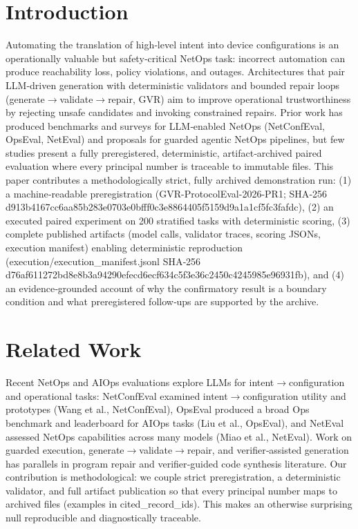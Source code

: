 \documentclass[conference]{IEEEtran}
\begin{document}
\section{Introduction}
Automating the translation of high‑level intent into device configurations is an operationally valuable but safety‑critical NetOps task: incorrect automation can produce reachability loss, policy violations, and outages. Architectures that pair LLM‑driven generation with deterministic validators and bounded repair loops (generate\ensuremath{\rightarrow}validate\ensuremath{\rightarrow}repair, GVR) aim to improve operational trustworthiness by rejecting unsafe candidates and invoking constrained repairs. Prior work has produced benchmarks and surveys for LLM‑enabled NetOps (NetConfEval, OpsEval, NetEval) and proposals for guarded agentic NetOps pipelines, but few studies present a fully preregistered, deterministic, artifact‑archived paired evaluation where every principal number is traceable to immutable files. This paper contributes a methodologically strict, fully archived demonstration run: (1) a machine‑readable preregistration (GVR-ProtocolEval-2026-PR1; SHA‑256 d913b4167cc6aa85b283e0703e0bfff0c3e8864405f5159d9a1a1cf5fc3fafdc), (2) an executed paired experiment on 200 stratified tasks with deterministic scoring, (3) complete published artifacts (model calls, validator traces, scoring JSONs, execution manifest) enabling deterministic reproduction (execution/execution\_manifest.jsonl SHA‑256 d76af611272bd8e8b3a94290efecd6ecf634c5f3e36c2450c4245985e96931fb), and (4) an evidence‑grounded account of why the confirmatory result is a boundary condition and what preregistered follow‑ups are supported by the archive.

\section{Related Work}
Recent NetOps and AIOps evaluations explore LLMs for intent\ensuremath{\rightarrow}configuration and operational tasks: NetConfEval examined intent\ensuremath{\rightarrow}configuration utility and prototypes (Wang et al., NetConfEval), OpsEval produced a broad Ops benchmark and leaderboard for AIOps tasks (Liu et al., OpsEval), and NetEval assessed NetOps capabilities across many models (Miao et al., NetEval). Work on guarded execution, generate\ensuremath{\rightarrow}validate\ensuremath{\rightarrow}repair, and verifier‑assisted generation has parallels in program repair and verifier‑guided code synthesis literature. Our contribution is methodological: we couple strict preregistration, a deterministic validator, and full artifact publication so that every principal number maps to archived files (examples in cited\_record\_ids). This makes an otherwise surprising null reproducible and diagnostically traceable.
\end{document}
